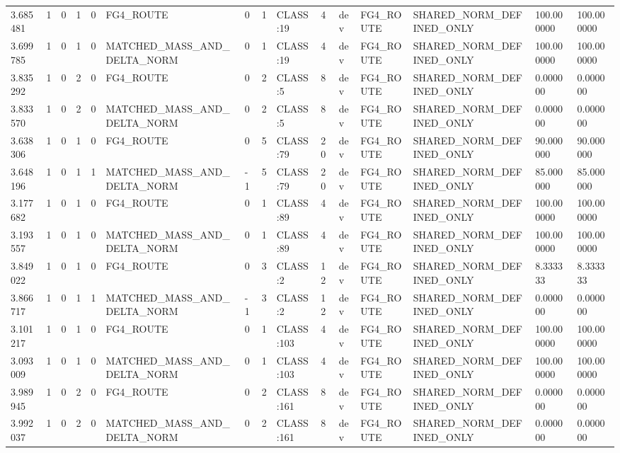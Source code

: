 \begin{tabular}{lllllllllllllll}
3.685481 & 1 & 0 & 1 & 0 & FG4\_ROUTE & 0 & 1 & CLASS:19 & 4 & dev & FG4\_ROUTE & SHARED\_NORM\_DEFINED\_ONLY & 100.000000 & 100.000000 \\
3.699785 & 1 & 0 & 1 & 0 & MATCHED\_MASS\_AND\_DELTA\_NORM & 0 & 1 & CLASS:19 & 4 & dev & FG4\_ROUTE & SHARED\_NORM\_DEFINED\_ONLY & 100.000000 & 100.000000 \\
3.835292 & 1 & 0 & 2 & 0 & FG4\_ROUTE & 0 & 2 & CLASS:5 & 8 & dev & FG4\_ROUTE & SHARED\_NORM\_DEFINED\_ONLY & 0.000000 & 0.000000 \\
3.833570 & 1 & 0 & 2 & 0 & MATCHED\_MASS\_AND\_DELTA\_NORM & 0 & 2 & CLASS:5 & 8 & dev & FG4\_ROUTE & SHARED\_NORM\_DEFINED\_ONLY & 0.000000 & 0.000000 \\
3.638306 & 1 & 0 & 1 & 0 & FG4\_ROUTE & 0 & 5 & CLASS:79 & 20 & dev & FG4\_ROUTE & SHARED\_NORM\_DEFINED\_ONLY & 90.000000 & 90.000000 \\
3.648196 & 1 & 0 & 1 & 1 & MATCHED\_MASS\_AND\_DELTA\_NORM & -1 & 5 & CLASS:79 & 20 & dev & FG4\_ROUTE & SHARED\_NORM\_DEFINED\_ONLY & 85.000000 & 85.000000 \\
3.177682 & 1 & 0 & 1 & 0 & FG4\_ROUTE & 0 & 1 & CLASS:89 & 4 & dev & FG4\_ROUTE & SHARED\_NORM\_DEFINED\_ONLY & 100.000000 & 100.000000 \\
3.193557 & 1 & 0 & 1 & 0 & MATCHED\_MASS\_AND\_DELTA\_NORM & 0 & 1 & CLASS:89 & 4 & dev & FG4\_ROUTE & SHARED\_NORM\_DEFINED\_ONLY & 100.000000 & 100.000000 \\
3.849022 & 1 & 0 & 1 & 0 & FG4\_ROUTE & 0 & 3 & CLASS:2 & 12 & dev & FG4\_ROUTE & SHARED\_NORM\_DEFINED\_ONLY & 8.333333 & 8.333333 \\
3.866717 & 1 & 0 & 1 & 1 & MATCHED\_MASS\_AND\_DELTA\_NORM & -1 & 3 & CLASS:2 & 12 & dev & FG4\_ROUTE & SHARED\_NORM\_DEFINED\_ONLY & 0.000000 & 0.000000 \\
3.101217 & 1 & 0 & 1 & 0 & FG4\_ROUTE & 0 & 1 & CLASS:103 & 4 & dev & FG4\_ROUTE & SHARED\_NORM\_DEFINED\_ONLY & 100.000000 & 100.000000 \\
3.093009 & 1 & 0 & 1 & 0 & MATCHED\_MASS\_AND\_DELTA\_NORM & 0 & 1 & CLASS:103 & 4 & dev & FG4\_ROUTE & SHARED\_NORM\_DEFINED\_ONLY & 100.000000 & 100.000000 \\
3.989945 & 1 & 0 & 2 & 0 & FG4\_ROUTE & 0 & 2 & CLASS:161 & 8 & dev & FG4\_ROUTE & SHARED\_NORM\_DEFINED\_ONLY & 0.000000 & 0.000000 \\
3.992037 & 1 & 0 & 2 & 0 & MATCHED\_MASS\_AND\_DELTA\_NORM & 0 & 2 & CLASS:161 & 8 & dev & FG4\_ROUTE & SHARED\_NORM\_DEFINED\_ONLY & 0.000000 & 0.000000 \\

\end{tabular}
